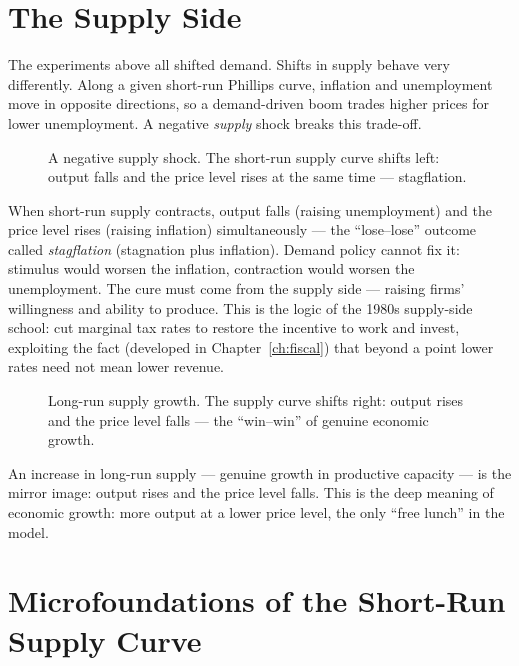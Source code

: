 \section{The Supply Side}

The experiments above all shifted demand. Shifts in supply behave very differently. Along a given short-run Phillips curve, inflation and unemployment move in opposite directions, so a demand-driven boom trades higher prices for lower unemployment. A negative \emph{supply} shock breaks this trade-off.

\begin{figure}[h]
\centering

\caption{A negative supply shock. The short-run supply curve shifts left: output falls and the price level rises at the same time --- stagflation.}
\label{fig:macro-28}
\end{figure}

When short-run supply contracts, output falls (raising unemployment) and the price level rises (raising inflation) simultaneously --- the ``lose--lose'' outcome called \emph{stagflation} (stagnation plus inflation). Demand policy cannot fix it: stimulus would worsen the inflation, contraction would worsen the unemployment. The cure must come from the supply side --- raising firms' willingness and ability to produce. This is the logic of the 1980s supply-side school: cut marginal tax rates to restore the incentive to work and invest, exploiting the fact (developed in Chapter~\ref{ch:fiscal}) that beyond a point lower rates need not mean lower revenue.

\begin{figure}[h]
\centering

\caption{Long-run supply growth. The supply curve shifts right: output rises and the price level falls --- the ``win--win'' of genuine economic growth.}
\label{fig:macro-29}
\end{figure}

An increase in long-run supply --- genuine growth in productive capacity --- is the mirror image: output rises and the price level falls. This is the deep meaning of economic growth: more output at a lower price level, the only ``free lunch'' in the model.


\section{Microfoundations of the Short-Run Supply Curve}

